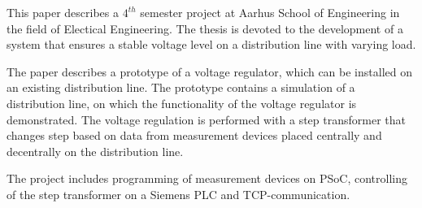 
This paper describes a $4^{th}$ semester project at Aarhus School of Engineering in the field of Electical Engineering. The thesis is devoted to the development of a system that ensures a stable voltage level on a distribution line with varying load.

The paper describes a prototype of a voltage regulator, which can be installed on an existing distribution line. The prototype contains a simulation of a distribution line, on which the functionality of the voltage regulator is demonstrated. The voltage regulation is performed with a step transformer that changes step based on data from measurement devices placed centrally and decentrally on the distribution line. 

The project includes programming of measurement devices on PSoC, controlling of the step transformer on a Siemens PLC and TCP-communication.

